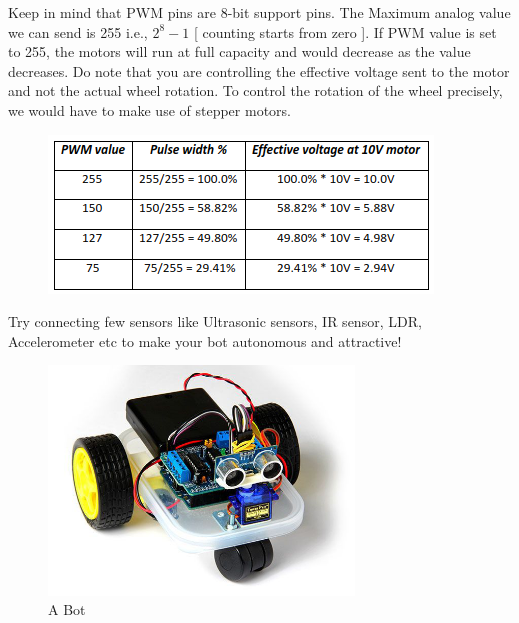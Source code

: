 Keep in mind that PWM pins are 8-bit support pins. The Maximum analog value we can send is 255 i.e., $ 2^8 - 1 $ [ counting starts from zero ]. If PWM value is set to 255, the motors will run at full capacity and would decrease as the value decreases. Do note that you are controlling the effective voltage sent to the motor and not the actual wheel rotation. To control the rotation of the wheel precisely, we would have to make use of stepper motors.
\begin{figure}
    \centering
    \includegraphics{Chapters/images/md3.png}
\end{figure}
Try connecting few sensors like Ultrasonic sensors, IR sensor, LDR, Accelerometer etc to make your bot autonomous and attractive!
\begin{figure}
    \centering
    \includegraphics[width=3.2in]{Chapters/images/MotorDriver_end_pic.png}
    \caption{A Bot}
\end{figure}